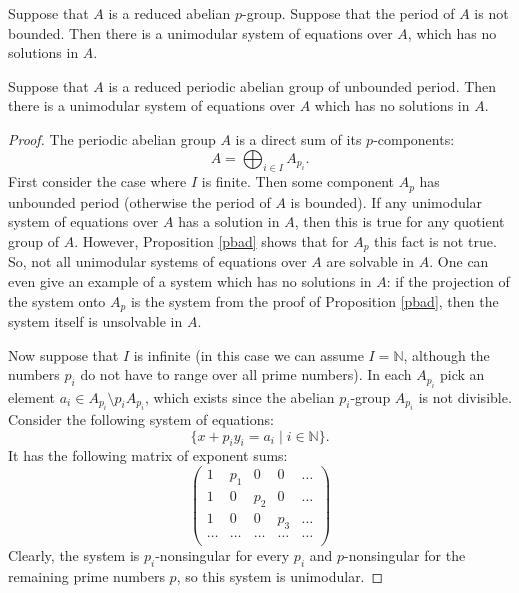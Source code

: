 \documentclass[10pt,a4paper]{amsart}
\begin{document}
\begin{prop}\label{pbad}
Suppose that $A$ is a reduced abelian $p$-group.
Suppose that the period of $A$ is not bounded.
Then there is a unimodular system of equations over $A$,
which has no solutions in $A$.
\end{prop}

\begin{lemma}\label{bad}
Suppose that $A$ is a reduced periodic abelian group
of unbounded period.
Then there is a unimodular system of equations
over $A$
which has no solutions in $A$.
\end{lemma}

\begin{proof}
The periodic abelian group $A$ is a direct sum
of its $p$-components:
$$
A = \bigoplus_{i \in I} A_{p_i}.
$$
First consider the case where $I$ is finite.
Then some component $A_p$ has unbounded period
(otherwise the period of $A$ is bounded).
If any unimodular system of equations over $A$ has a solution in $A$,
then this is true for any quotient group of $A$.
However, Proposition \ref{pbad} shows that
for $A_p$ this fact is not true.
So, not all unimodular systems of equations over $A$
are solvable in $A$. One can even give an example
of a system which has no solutions in $A$: if the projection
of the system onto $A_p$ is the system from the proof of Proposition \ref{pbad},
then the system itself is unsolvable in $A$.

Now suppose that $I$ is infinite (in this case we can assume $I = \mathbb N$,
although the numbers $p_i$ do not have to range over all prime numbers).
In each $A_{p_i}$ pick an element
$a_i \in A_{p_i}\setminus p_iA_{p_i}$, which exists
since the abelian $p_i$-group $A_{p_i}$ is not divisible.
Consider the following system of equations:
$$
\{x + p_i y_i = a_i \mid i \in \mathbb N \}.
$$
It has the following matrix of exponent sums:
$$
\begin{pmatrix}
1 & p_1 & 0 & 0 &\dots \\
1 & 0 & p_2 & 0 &\dots \\
1 & 0 & 0 & p_3 & \dots \\
\dots & \dots & \dots & \dots & \dots \\
\end{pmatrix}
$$
Clearly, the system is $p_i$-nonsingular
for every $p_i$ and $p$-nonsingular
for the remaining prime numbers $p$, so this system is unimodular.


\end{proof}
\end{document}
